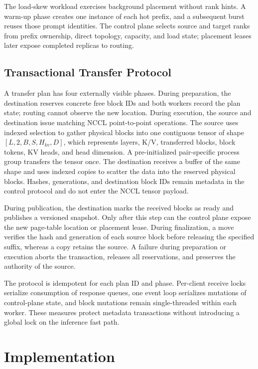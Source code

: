 \documentclass{article}
\begin{document}
The load-skew workload exercises background placement without rank hints. A warm-up phase creates one instance of each hot prefix, and a subsequent burst reuses those prompt identities. The control plane selects source and target ranks from prefix ownership, direct topology, capacity, and load state; placement leases later expose completed replicas to routing.

\subsection{Transactional Transfer Protocol}

A transfer plan has four externally visible phases. During preparation, the destination reserves concrete free block IDs and both workers record the plan state; routing cannot observe the new location. During execution, the source and destination issue matching NCCL point-to-point operations. The source uses indexed selection to gather physical blocks into one contiguous tensor of shape $[L,2,B,S,H_{kv},D]$, which represents layers, K/V, transferred blocks, block tokens, KV heads, and head dimension. A pre-initialized pair-specific process group transfers the tensor once. The destination receives a buffer of the same shape and uses indexed copies to scatter the data into the reserved physical blocks. Hashes, generations, and destination block IDs remain metadata in the control protocol and do not enter the NCCL tensor payload.

During publication, the destination marks the received blocks as ready and publishes a versioned snapshot. Only after this step can the control plane expose the new page-table location or placement lease. During finalization, a move verifies the hash and generation of each source block before releasing the specified suffix, whereas a copy retains the source. A failure during preparation or execution aborts the transaction, releases all reservations, and preserves the authority of the source.

The protocol is idempotent for each plan ID and phase. Per-client receive locks serialize consumption of response queues, one event loop serializes mutations of control-plane state, and block mutations remain single-threaded within each worker. These measures protect metadata transactions without introducing a global lock on the inference fast path.

\section{Implementation}
\label{sec:impl}
\end{document}
